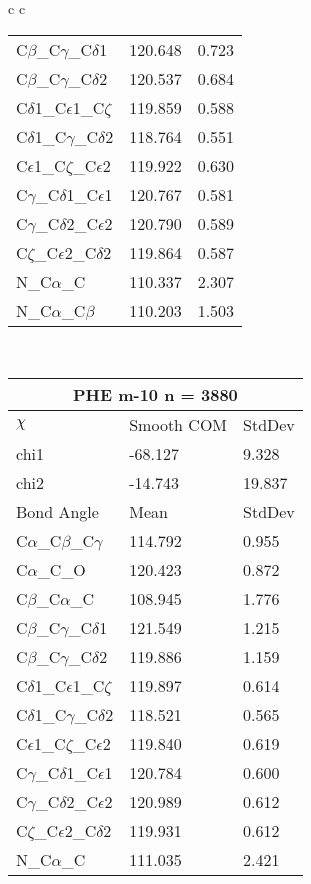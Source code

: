 \begin{longtable}{ c c }
\begin{tabular}{ l l l }
  C$\beta$\_C$\gamma$\_C$\delta$1 & 120.648 & 0.723\\
  C$\beta$\_C$\gamma$\_C$\delta$2 & 120.537 & 0.684\\
  C$\delta$1\_C$\epsilon$1\_C$\zeta$ & 119.859 & 0.588\\
  C$\delta$1\_C$\gamma$\_C$\delta$2 & 118.764 & 0.551\\
  C$\epsilon$1\_C$\zeta$\_C$\epsilon$2 & 119.922 & 0.630\\
  C$\gamma$\_C$\delta$1\_C$\epsilon$1 & 120.767 & 0.581\\
  C$\gamma$\_C$\delta$2\_C$\epsilon$2 & 120.790 & 0.589\\
  C$\zeta$\_C$\epsilon$2\_C$\delta$2 & 119.864 & 0.587\\
  N\_C$\alpha$\_C & 110.337 & 2.307\\
  N\_C$\alpha$\_C$\beta$ & 110.203 & 1.503\\
  \bottomrule
  \end{tabular}
  \\
  \begin{tabular}{ l l l }
  \toprule
  \multicolumn{3}{c}{PHE \textbf{m-10} n = 3880} \\ \toprule
  $\chi$       & Smooth COM & StdDev \\ \midrule
  chi1 & -68.127 & 9.328 \\ 
  chi2 & -14.743 & 19.837 \\ \midrule
  Bond Angle   & Mean     & StdDev \\ \midrule
  C$\alpha$\_C$\beta$\_C$\gamma$ & 114.792 & 0.955\\
  C$\alpha$\_C\_O & 120.423 & 0.872\\
  C$\beta$\_C$\alpha$\_C & 108.945 & 1.776\\
  C$\beta$\_C$\gamma$\_C$\delta$1 & 121.549 & 1.215\\
  C$\beta$\_C$\gamma$\_C$\delta$2 & 119.886 & 1.159\\
  C$\delta$1\_C$\epsilon$1\_C$\zeta$ & 119.897 & 0.614\\
  C$\delta$1\_C$\gamma$\_C$\delta$2 & 118.521 & 0.565\\
  C$\epsilon$1\_C$\zeta$\_C$\epsilon$2 & 119.840 & 0.619\\
  C$\gamma$\_C$\delta$1\_C$\epsilon$1 & 120.784 & 0.600\\
  C$\gamma$\_C$\delta$2\_C$\epsilon$2 & 120.989 & 0.612\\
  C$\zeta$\_C$\epsilon$2\_C$\delta$2 & 119.931 & 0.612\\
  N\_C$\alpha$\_C & 111.035 & 2.421\\

\end{tabular}
\end{longtable}
